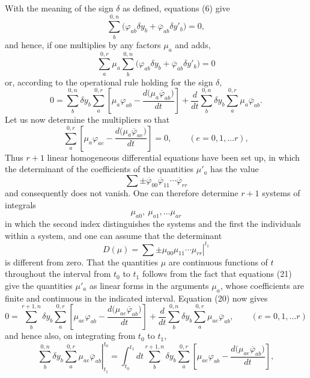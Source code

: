 \documentclass[11pt,a4paper,leqno]{article}
\begin{document}
With the meaning of the sign $\delta$ as defined, equations (6) give
\[
\sum_b^{0,n}\bigl(\varphi_{ab}\delta y_b+\overline{\varphi}_{ab}\delta y'_b\bigr)=0,
\]
and hence, if one multiplies by any factors $\mu_a$ and adds,
\[
\sum_a^{0,r}\mu_a\sum_b^{0,n}
\bigl(\varphi_{ab}\delta y_b+\overline{\varphi}_{ab}\delta y'_b\bigr)=0
\]
or, according to the operational rule holding for the sign $\delta$,
\begin{equation}\tag{20}
0=
\sum_b^{0,n}\delta y_b\sum_a^{0,r}
\left[
\mu_a\varphi_{ab}-\frac{d\bigl(\mu_a\overline{\varphi}_{ab}\bigr)}{dt}
\right]
+\frac{d}{dt}\sum_b^{0,n}\delta y_b\sum_a^{0,r}
\mu_a\overline{\varphi}_{ab}.
\end{equation}
Let us now determine the multipliers so that
\begin{equation}\tag{21}
\sum_a^{0,r}
\left[
\mu_a\varphi_{ae}-\frac{d\bigl(\mu_a\overline{\varphi}_{ae}\bigr)}{dt}
\right]=0,
\qquad(e=0,1,\ldots r),
\end{equation}
Thus $r+1$ linear homogeneous differential equations have been set up, in which the determinant of the coefficients of the quantities $\mu'_a$ has the value
\[
\sum\mathord{\pm}\overline{\varphi}_{00}\overline{\varphi}_{11}\cdots
\overline{\varphi}_{rr}
\]
and consequently does not vanish. One can therefore determine $r+1$ systems of integrals
\begin{equation}\tag{22}
\mu_{a0},\ \mu_{a1},\ldots\mu_{ar}
\end{equation}
in which the second index distinguishes the systems and the first the individuals within a system, and one can assume that the determinant
\[
D(\mu)=
\left.\sum\mathord{\pm}\mu_{00}\mu_{11}\cdots\mu_{rr}\right|^{t_1}
\]
is different from zero. That the quantities $\mu$ are continuous functions of $t$ throughout the interval from $t_0$ to $t_1$ follows from the fact that equations (21) give the quantities $\mu'_a$ as linear forms in the arguments $\mu_a$, whose coefficients are finite and continuous in the indicated interval. Equation (20) now gives
\[
0=
\sum_b^{r+1,n}\delta y_b\sum_a^{0,r}
\left[
\mu_{ae}\varphi_{ab}-\frac{d\bigl(\mu_{ae}\overline{\varphi}_{ab}\bigr)}{dt}
\right]
+\frac{d}{dt}\sum_b^{0,n}\delta y_b\sum_a^{0,r}
\mu_{ae}\overline{\varphi}_{ab},
\qquad(e=0,1,\ldots r)
\]
and hence also, on integrating from $t_0$ to $t_1$,
\[
\left.
\sum_b^{0,n}\delta y_b\sum_a^{0,r}\mu_{ae}\overline{\varphi}_{ab}
\right|_{t_1}^{t_0}
=
\int_{t_0}^{t_1}dt\sum_b^{r+1,n}\delta y_b\sum_a^{0,r}
\left[
\mu_{ae}\varphi_{ab}-\frac{d\bigl(\mu_{ae}\overline{\varphi}_{ab}\bigr)}{dt}
\right],
\]
\end{document}
